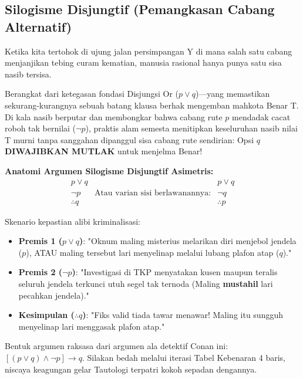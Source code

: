\subsection{Silogisme Disjungtif (Pemangkasan Cabang Alternatif)}

Ketika kita tertohok di ujung jalan persimpangan Y di mana salah satu cabang menjanjikan tebing curam kematian, manusia rasional hanya punya satu sisa nasib tersisa.

\begin{teorema}
Berangkat dari ketegasan fondasi Disjungsi Or ($p \lor q$)—yang memastikan sekurang-kurangnya sebuah batang klausa berhak mengemban mahkota Benar T. Di kala nasib berputar dan membongkar bahwa cabang rute $p$ mendadak cacat roboh tak bernilai ($\neg p$), praktis alam semesta menitipkan keseluruhan nasib nilai T murni tanpa sanggahan dipanggul sisa cabang rute sendirian: Opsi $q$ \textbf{DIWAJIBKAN MUTLAK} untuk menjelma Benar!
\end{teorema}

\textbf{Anatomi Argumen Silogisme Disjungtif Asimetris:}
\[
\begin{array}{ccc}
p \vee q & & p \vee q\\
\neg p   & \text{Atau varian sisi berlawanannya:} & \neg q \\
\hline
\therefore q & & \therefore p
\end{array}
\]

\begin{contoh}
Skenario kepastian alibi kriminalisasi:
\begin{itemize}
    \item \textbf{Premis 1 ($p \vee q$)}: "Oknum maling misterius melarikan diri menjebol jendela ($p$), ATAU maling tersebut lari menyelinap melalui lubang plafon atap ($q$)."
    \item \textbf{Premis 2 ($\neg p$)}: "Investigasi di TKP menyatakan kusen maupun teralis seluruh jendela terkunci utuh segel tak ternoda (Maling \textbf{mustahil} lari pecahkan jendela)."
    \item \textbf{Kesimpulan ($\therefore q$)}: "Fiks valid tiada tawar menawar! Maling itu sungguh menyelinap lari menggasak plafon atap."
\end{itemize}
\end{contoh}
Bentuk argumen raksasa dari argumen ala detektif Conan ini: $[(p \lor q) \land \neg p] \rightarrow q$. Silakan bedah melalui iterasi Tabel Kebenaran 4 baris, niscaya keagungan gelar Tautologi terpatri kokoh sepadan dengannya.

